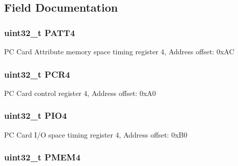 \subsection{Field Documentation}
\hypertarget{struct_f_s_m_c___bank4___type_def_a955cad1aab7fb2d5b6e216cb29b5e7e2}{
\subsubsection[{P\-A\-T\-T4}]{ uint32\-\_\-t P\-A\-T\-T4}}\label{struct_f_s_m_c___bank4___type_def_a955cad1aab7fb2d5b6e216cb29b5e7e2}
P\-C Card Attribute memory space timing register 4, Address offset\-: 0x\-A\-C \hypertarget{struct_f_s_m_c___bank4___type_def_a2f02e7acfbd7e549ede84633215eb6a1}{
\subsubsection[{P\-C\-R4}]{ uint32\-\_\-t P\-C\-R4}}\label{struct_f_s_m_c___bank4___type_def_a2f02e7acfbd7e549ede84633215eb6a1}
P\-C Card control register 4, Address offset\-: 0x\-A0 \hypertarget{struct_f_s_m_c___bank4___type_def_ac53cd7a08093a4ae8f4de4bcff67a64f}{
\subsubsection[{P\-I\-O4}]{ uint32\-\_\-t P\-I\-O4}}\label{struct_f_s_m_c___bank4___type_def_ac53cd7a08093a4ae8f4de4bcff67a64f}
P\-C Card I/\-O space timing register 4, Address offset\-: 0x\-B0 \hypertarget{struct_f_s_m_c___bank4___type_def_a3f82cc749845fb0dd7dfa8121d96b663}{
\subsubsection[{P\-M\-E\-M4}]{ uint32\-\_\-t P\-M\-E\-M4}}\label{struct_f_s_m_c___bank4___type_def_a3f82cc749845fb0dd7dfa8121d96b663}
